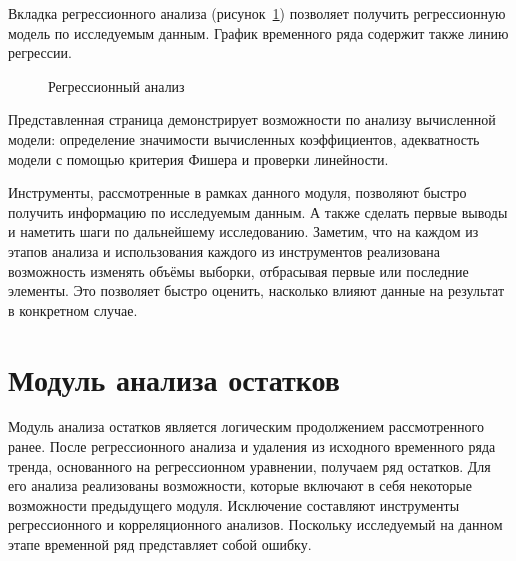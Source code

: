 Вкладка регрессионного анализа (рисунок~\ref{img:mod_regr}) позволяет получить регрессионную модель по исследуемым данным. График временного ряда содержит также линию регрессии.
\begin{figure}[ht]
\caption{Регрессионный анализ}
\label{img:mod_regr}
\end{figure}
Представленная страница демонстрирует возможности по анализу вычисленной модели: определение значимости вычисленных коэффициентов, адекватность модели с помощью критерия Фишера и проверки линейности.

Инструменты, рассмотренные в рамках данного модуля, позволяют быстро получить информацию по исследуемым данным. А также сделать первые выводы и наметить шаги по дальнейшему исследованию. Заметим, что на каждом из этапов анализа и использования каждого из инструментов реализована возможность изменять объёмы выборки, отбрасывая первые или последние элементы. Это позволяет быстро оценить, насколько влияют данные на результат в конкретном случае.


\section{Модуль анализа остатков} %
\label{sec:mod_residuals}

Модуль анализа остатков является логическим продолжением рассмотренного ранее. После регрессионного анализа и удаления из исходного временного ряда тренда, основанного на регрессионном уравнении, получаем ряд остатков. Для его анализа реализованы возможности, которые включают в себя некоторые возможности предыдущего модуля. Исключение составляют инструменты регрессионного и корреляционного анализов. Поскольку исследуемый на данном этапе временной ряд представляет собой ошибку.

